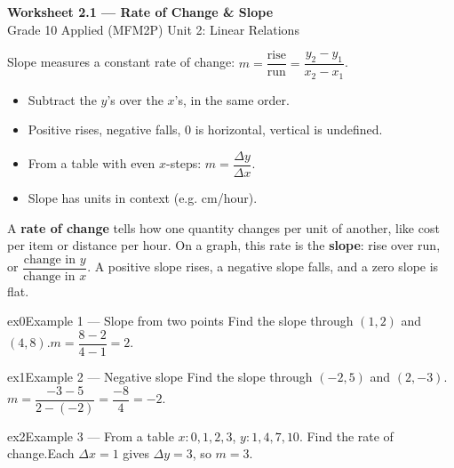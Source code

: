 \documentclass[11pt]{article}
\begin{document}
\begin{center}
{\LARGE\bfseries\color{titleblue}Worksheet 2.1 --- Rate of Change \& Slope}\\[2pt]
{\small Grade 10 Applied (MFM2P) \textperiodcentered{} Unit 2: Linear Relations}
\end{center}

\begin{ideabox}
Slope measures a constant rate of change: $m=\dfrac{\text{rise}}{\text{run}}=\dfrac{y_2-y_1}{x_2-x_1}$.
\begin{itemize}[leftmargin=*,itemsep=2pt]
  \item Subtract the $y$'s over the $x$'s, in the same order.
  \item Positive rises, negative falls, $0$ is horizontal, vertical is undefined.
  \item From a table with even $x$-steps: $m=\dfrac{\Delta y}{\Delta x}$.
  \item Slope has units in context (e.g. cm/hour).
\end{itemize}
\end{ideabox}

\begin{learnbox}
A \textbf{rate of change} tells how one quantity changes per unit of another, like cost per item or distance per hour.
On a graph, this rate is the \textbf{slope}: rise over run, or $\dfrac{\text{change in }y}{\text{change in }x}$.
A positive slope rises, a negative slope falls, and a zero slope is flat.
\end{learnbox}


\begin{example}{ex0}{Example 1 --- Slope from two points}
Find the slope through $(1,2)$ and $(4,8)$.\soln $m=\dfrac{8-2}{4-1}=2$.
\end{example}

\begin{example}{ex1}{Example 2 --- Negative slope}
Find the slope through $(-2,5)$ and $(2,-3)$.\soln $m=\dfrac{-3-5}{2-(-2)}=\dfrac{-8}{4}=-2$.
\end{example}

\begin{example}{ex2}{Example 3 --- From a table}
$x:0,1,2,3$, $y:1,4,7,10$. Find the rate of change.\soln Each $\Delta x=1$ gives $\Delta y=3$, so $m=3$.
\end{example}
\end{document}
